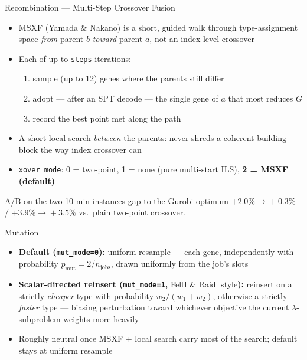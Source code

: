 \documentclass[aspectratio=169,t]{beamer}
\newcommand{\code}[1]{\texttt{#1}}
\begin{document}
\begin{frame}{Recombination --- Multi-Step Crossover Fusion}
  \begin{itemize}
    \item \alert{MSXF} (Yamada \& Nakano) is a short, guided walk through
      type-assignment space \emph{from} parent $b$ \emph{toward} parent $a$,
      not an index-level crossover
    \item Each of up to \code{steps} iterations:
    \begin{enumerate}
      \item sample (up to 12) genes where the parents still differ
      \item adopt --- after an SPT decode --- the single gene of $a$ that
        most reduces $G$
      \item record the best point met along the path
    \end{enumerate}
    \item A short local search \emph{between} the parents: never shreds a
      coherent building block the way index crossover can
    \item \code{xover\_mode}: 0 = two-point, 1 = none (pure multi-start ILS),
      \textbf{2 = MSXF (default)}
  \end{itemize}
  \begin{alertblock}{A/B on the two 10-min instances}
    gap to the Gurobi optimum \; $+2.0\%\!\to\!+0.3\%$ \; / \; $+3.9\%\!\to\!+3.5\%$
    \; vs.\ plain two-point crossover.
  \end{alertblock}
\end{frame}

\begin{frame}{Mutation}
  \begin{itemize}
    \item \textbf{Default (\code{mut\_mode=0}):} uniform resample --- each gene,
      independently with probability $p_{\text{mut}} = 2/n_{\text{jobs}}$, drawn
      uniformly from the job's slots
    \item \textbf{Scalar-directed reinsert (\code{mut\_mode=1},} Feltl \& Raidl
      style\textbf{):} reinsert on a strictly \emph{cheaper} type with
      probability $w_2/(w_1{+}w_2)$, otherwise a strictly \emph{faster} type ---
      biasing perturbation toward whichever objective the current
      $\lambda$-subproblem weights more heavily
    \item Roughly neutral once MSXF + local search carry most of the search;
      default stays at uniform resample
  \end{itemize}
\end{frame}
\end{document}
